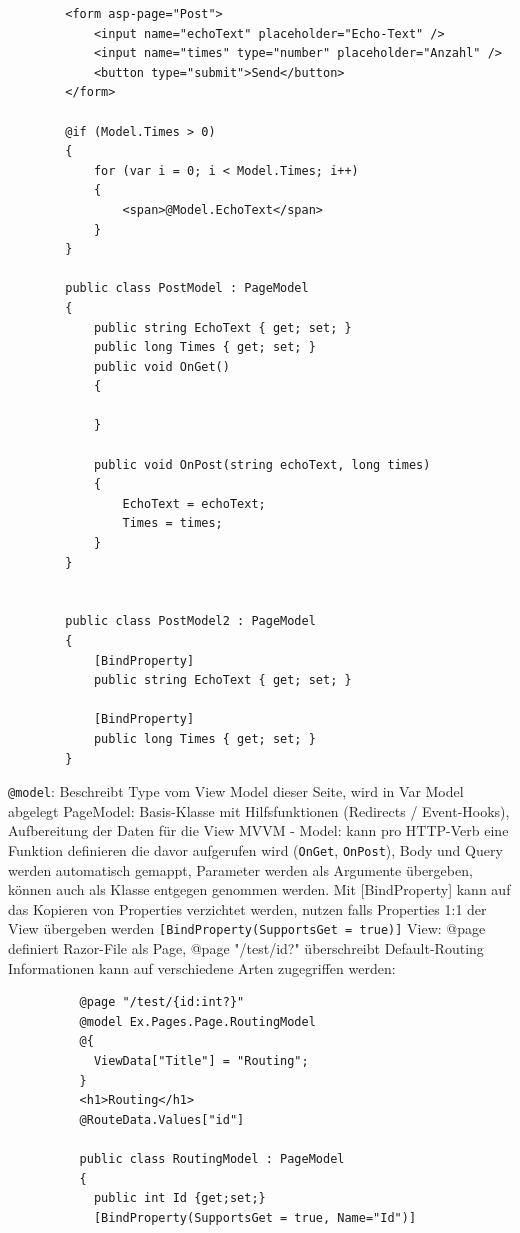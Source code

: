 \documentclass[10pt,landscape]{article}
\begin{document}
\begin{multicols}{2}
\begin{lstlisting}
        <form asp-page="Post">
            <input name="echoText" placeholder="Echo-Text" />
            <input name="times" type="number" placeholder="Anzahl" />
            <button type="submit">Send</button>
        </form>

        @if (Model.Times > 0)
        {
            for (var i = 0; i < Model.Times; i++)
            {
                <span>@Model.EchoText</span>
            }
        }

        public class PostModel : PageModel
        {
            public string EchoText { get; set; }
            public long Times { get; set; }
            public void OnGet()
            {

            }   

            public void OnPost(string echoText, long times)
            {
                EchoText = echoText;
                Times = times;            
            }
        }


        public class PostModel2 : PageModel
        {
            [BindProperty]
            public string EchoText { get; set; }

            [BindProperty]
            public long Times { get; set; }
        }
        \end{lstlisting}
        \lstinline{@model}: Beschreibt Type vom View Model dieser Seite, wird in Var Model abgelegt
        PageModel: Basis-Klasse mit Hilfsfunktionen (Redirects / Event-Hooks), Aufbereitung der Daten für die View
        MVVM - Model: kann pro HTTP-Verb eine Funktion definieren die davor aufgerufen wird (\lstinline{OnGet}, \lstinline{OnPost}), Body und Query werden automatisch gemappt, Parameter werden als Argumente übergeben, können auch als Klasse entgegen genommen werden.
        Mit [BindProperty] kann auf das Kopieren von Properties verzichtet werden, nutzen falls Properties 1:1 der View übergeben werden \lstinline{[BindProperty(SupportsGet = true)]}
        View: @page definiert Razor-File als Page, @page "/test/{id?}" überschreibt Default-Routing Informationen
        kann auf verschiedene Arten zugegriffen werden:
        \begin{lstlisting}
          @page "/test/{id:int?}"
          @model Ex.Pages.Page.RoutingModel
          @{
            ViewData["Title"] = "Routing";
          }
          <h1>Routing</h1>
          @RouteData.Values["id"]

          public class RoutingModel : PageModel
          {
            public int Id {get;set;}
            [BindProperty(SupportsGet = true, Name="Id")]


\end{lstlisting}
\end{multicols}
\end{document}
